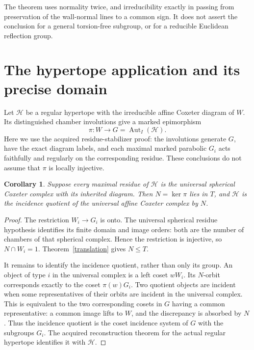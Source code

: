 \documentclass[11pt,a4paper]{article}
\newtheorem{corollary}[theorem]{Corollary}
\begin{document}
The theorem uses normality twice, and irreducibility exactly in passing
from preservation of the wall-normal lines to a common sign. It does not
assert the conclusion for a general torsion-free subgroup, or for a
reducible Euclidean reflection group.

\section{The hypertope application and its precise domain}

Let $\mathcal H$ be a regular hypertope with the irreducible affine
Coxeter diagram of $W$. Its distinguished chamber involutions give a
marked epimorphism
\[
                 \pi:W\longrightarrow G=\operatorname{Aut}_I(\mathcal H).
\]
Here we use the acquired residue-stabilizer proof: the involutions
generate $G$, have the exact diagram labels, and each maximal marked
parabolic $G_i$ acts faithfully and regularly on the corresponding
residue. These conclusions do not assume that $\pi$ is locally injective.

\begin{corollary}\label{hypertope}
Suppose every maximal residue of $\mathcal H$ is the universal spherical
Coxeter complex with its inherited diagram. Then $N=\ker\pi$ lies in
$T$, and $\mathcal H$ is the incidence quotient of the universal affine
Coxeter complex by $N$.
\end{corollary}
\begin{proof}
The restriction $W_i\to G_i$ is onto. The universal spherical residue
hypothesis identifies its finite domain and image orders: both are the
number of chambers of that spherical complex. Hence the restriction is
injective, so $N\cap W_i=1$. Theorem~\ref{translation} gives $N\leq T$.

It remains to identify the incidence quotient, rather than only its
group. An object of type $i$ in the universal complex is a left coset
$wW_i$. Its $N$-orbit corresponds exactly to the coset
$\pi(w)G_i$. Two quotient objects are incident when some representatives
of their orbits are incident in the universal complex. This is equivalent
to the two corresponding cosets in $G$ having a common representative:
a common image lifts to $W$, and the discrepancy is absorbed by $N$.
Thus the incidence quotient is the coset incidence system of $G$ with
the subgroups $G_i$. The acquired reconstruction theorem for the actual
regular hypertope identifies it with $\mathcal H$.
\end{proof}
\end{document}
